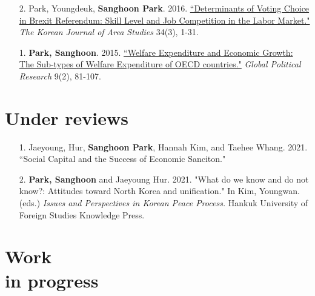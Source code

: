 \documentclass[margin,line]{res}
\begin{document}
\begin{resume}
\begin{enumerate}[leftmargin=*]
\item[2.] Park, Youngdeuk, \textbf{Sanghoon Park}. 2016. \href{http://kiss.kstudy.com/thesis/thesis-view.asp?key=3472800}{``Determinants of Voting Choice in Brexit Referendum: Skill Level and Job Competition in the Labor Market."} \textit{The Korean Journal of Area Studies} 34(3), 1-31.	
\item[1.] \textbf{Park, Sanghoon}. 2015. \href{http://search.koreanstudies.net/thesis/thesis-view.asp?key=3438155}{``Welfare Expenditure and Economic Growth: The Sub-types of Welfare Expenditure of OECD countries."} \textit{Global Political Research} 9(2), 81-107.	
\end{enumerate}

\section{\sc Under reviews}

\begin{enumerate}[leftmargin=*]
\item[1.] Jaeyoung, Hur, \textbf{Sanghoon Park}, Hannah Kim, and Taehee Whang. 2021. ``Social Capital and the Success of Economic Sanciton."
\item[2.] \textbf{Park, Sanghoon} and Jaeyoung Hur. 2021. "What do we know and do not know?: Attitudes toward North Korea and unification." In Kim, Youngwan. (eds.) {\it Issues and Perspectives in Korean Peace Process.} Hankuk University of Foreign Studies Knowledge Press.
\end{enumerate}



\section{\sc Work\\in progress}


\end{resume}
\end{document}

